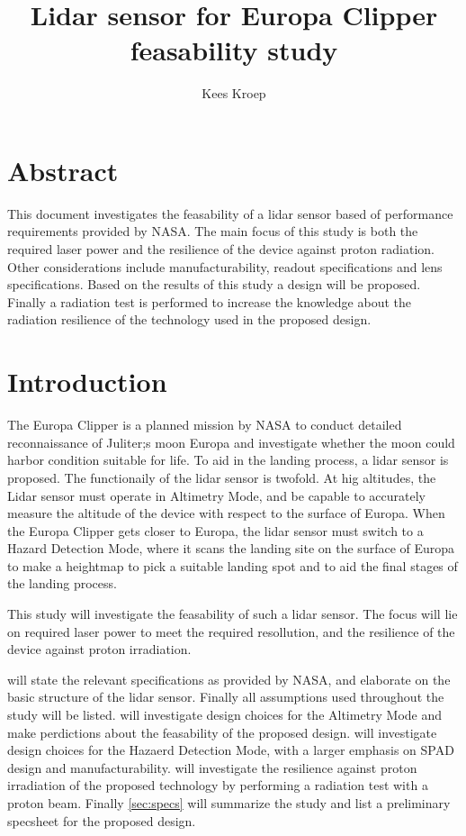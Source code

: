 \documentclass[]{report}
\title{Lidar sensor for Europa Clipper feasability study}
\author{Kees Kroep}
\begin{document}
  \maketitle


\section*{Abstract}
This document investigates the feasability of a lidar sensor based of performance requirements provided by NASA. The main focus of this study is both the required laser power and the resilience of the device against proton radiation. Other considerations include manufacturability, readout specifications and lens specifications. Based on the results of this study a design will be proposed. Finally a radiation test is performed to increase the knowledge about the radiation resilience of the technology used in the proposed design.

\tableofcontents
\clearpage

\section*{Introduction}
The Europa Clipper is a planned mission by NASA  to conduct  detailed reconnaissance of Juliter;s moon Europa and investigate whether the moon could harbor condition suitable for life. To aid in the landing process, a lidar sensor is proposed. The functionaily of the lidar sensor is twofold. At hig altitudes, the Lidar sensor must operate in Altimetry Mode, and be capable to accurately measure the altitude of the device with respect to the surface of Europa. When the Europa Clipper gets closer to Europa, the lidar sensor must switch to a Hazard Detection Mode, where it scans the landing site on the surface of Europa to make a heightmap to pick a suitable landing spot and to aid the final stages of the landing process.

This study will investigate the feasability of such a lidar sensor. The focus will lie on required laser power to meet the required resollution, and the resilience of the device against proton irradiation. 

 will state the relevant specifications as provided by NASA, and elaborate on the basic structure of the lidar sensor. Finally all assumptions used throughout the study will be listed.  will investigate design choices for the Altimetry Mode and make perdictions about the feasability of the proposed design.  will investigate design choices for the Hazaerd Detection Mode, with a larger emphasis on SPAD design and manufacturability.  will investigate the resilience against proton irradiation of the proposed technology by performing a radiation test with a proton beam. Finally \cref{sec:specs} will summarize the study and list a preliminary specsheet for the proposed design.
\end{document}
